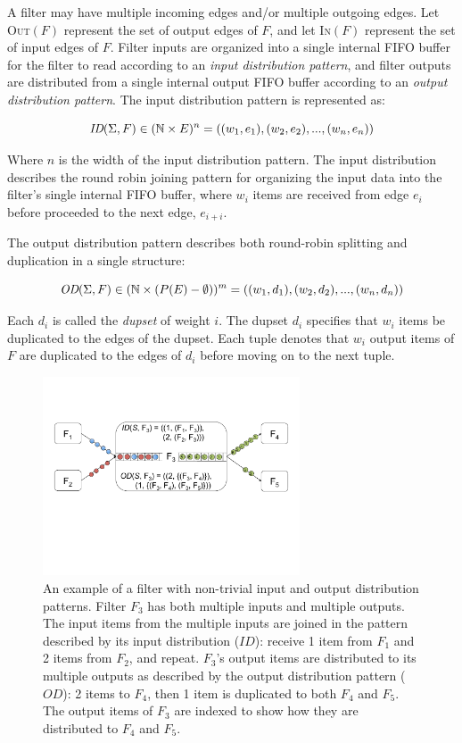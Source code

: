 A filter may have multiple incoming edges and/or multiple outgoing
edges.  Let \textsc{Out}$(F)$ represent the set of output edges of $F$, and 
let \textsc{In}$(F)$ represent the set of input edges of $F$.
Filter inputs are organized into a single internal FIFO buffer for the
filter to read according to an {\it input distribution pattern}, and
filter outputs are distributed from a single internal output FIFO
buffer according to an {\it output distribution pattern}.   
The input distribution pattern is represented as:

\[ \mbox{\it ID}(\Sigma, F) \in (\mathbb{N} \times E)^n = ((w_1,e_1), (w_2,
e_2), ..., (w_n, e_n))\]

\noindent Where $n$ is the width of the input distribution pattern.
The input distribution describes the round robin joining pattern for
organizing the input data into the filter's single internal FIFO
buffer, where $w_i$ items are received from edge $e_i$ before
proceeded to the next edge, $e_{i+i}$.

The output distribution pattern describes both round-robin
splitting and duplication in a single structure:

\[ \mbox{\it OD}(\Sigma, F) \in (\mathbb{N} \times (P(E)-\emptyset))^m = ((w_1,d_1), (w_2,
d_2), ..., (w_n, d_n))\]

\noindent Each $d_i$ is called the {\it dupset} of weight $i$.  The
dupset $d_i$ specifies that $w_i$ items be duplicated to the edges
of the dupset.  Each tuple denotes that $w_i$ output items of $F$ are
duplicated to the edges of $d_i$ before moving on to the next tuple.

\begin{figure}[t]
\centering
\includegraphics[width=3in]{figures/dist-example.pdf}
\caption[Example of input and output distribution.]{
An example of a filter with non-trivial input and output distribution patterns.
Filter $F_3$ has both multiple inputs and multiple outputs.  The input
items from the multiple inputs are joined in the pattern described by
its input distribution ($ID$): receive 1 item from $F_1$ and 2
items from $F_2$, and repeat.  $F_3$'s output items are distributed to
its multiple outputs as described by the output distribution pattern
($OD$):  2 items to $F_4$, then 1 item is duplicated to both $F_4$ and
$F_5$.  The output items of $F_3$ are indexed to show how they are
distributed to $F_4$ and $F_5$.
\label{fig:dist-example}}
\end{figure}

